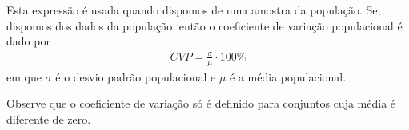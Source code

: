 Esta expressão é usada quando dispomos de uma amostra da população. Se, dispomos dos dados da população, então o coeficiente de variação populacional é dado por
\begin{equation*}
\begin{split}CVP=\frac{{\sigma}}{\mu}\cdot 100\%\end{split}
\end{equation*}
em que \(\sigma\) é o desvio padrão populacional e \(\mu\) é a média populacional.

Observe que o coeficiente de variação só é definido para conjuntos cuja média é diferente de zero.


\practice{ }
\label{\detokenize{PE104-5:sec-praticando2}}\label{\detokenize{PE104-5::doc}}\label{\detokenize{PE104-5:praticando}}\label{\detokenize{PE104-5:ativ-compara-categorias}}
